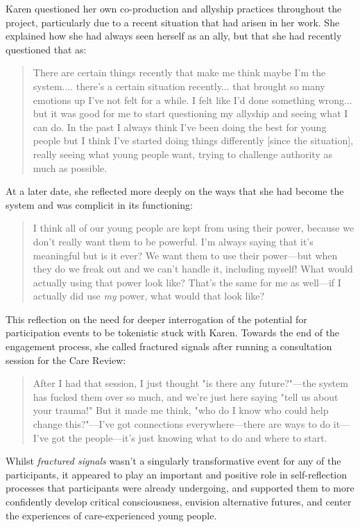 Karen questioned her own co-production and allyship practices throughout the project, particularly due to a recent situation that had arisen in her work. She explained how she had always seen herself as an ally, but that she had recently questioned that as:
\begin{quote}
There are certain things recently that make me think maybe I'm the system.... there's a certain situation recently... that brought so many emotions up I've not felt for a while. I felt like I'd done something wrong... but it was good for me to start questioning my allyship and seeing what I can do. In the past I always think I've been doing the best for young people but I think I've started doing things differently [since the situation], really seeing what young people want, trying to challenge authority as much as possible.
\end{quote}
At a later date, she reflected more deeply on the ways that she had become the system and was complicit in its functioning:
\begin{quote}
I think all of our young people are kept from using their power, because we don't really want them to be powerful. I'm always saying that it's meaningful but is it ever? We want them to use their power—but when they do we freak out and we can't handle it, including myself! What would actually using that power look like? That's the same for me as well—if I actually did use \textit{my} power, what would that look like? 
\end{quote}
This reflection on the need for deeper interrogation of the potential for participation events to be tokenistic stuck with Karen. Towards the end of the engagement process, she called fractured signals after running a consultation session for the Care Review:
\begin{quote}
After I had that session, I just thought "is there any future?"—the system has fucked them over so much,  and we're just here saying "tell us about your trauma!" But it made me think, "who do I know who could help change this?"—I've got connections everywhere—there are ways to do it—I've got the people—it's just knowing what to do and where to start.
\end{quote}
Whilst \textit{fractured signals} wasn't a singularly transformative event for any of the participants, it appeared to play an important and positive role in self-reflection processes that participants were already undergoing, and supported them to more confidently develop critical consciousness, envision alternative futures, and center the experiences of care-experienced young people. 

